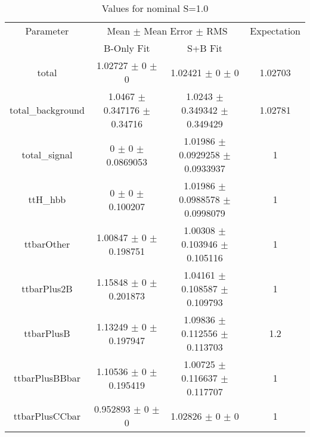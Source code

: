 \begin{table}
\centering
\caption{Values for nominal S=1.0}
\begin{tabular}{cccc}
\toprule
Parameter & \multicolumn{2}{c}{Mean $\pm$ Mean Error $\pm$ RMS} & Expectation\\
 & B-Only Fit & S+B Fit & \\
\midrule
total & \num{1.02727} $\pm$ \num{0} $\pm$ \num{0} & \num{1.02421} $\pm$ \num{0} $\pm$ \num{0} & \num{1.02703}\\
total\_background & \num{1.0467} $\pm$ \num{0.347176} $\pm$ \num{0.34716} & \num{1.0243} $\pm$ \num{0.349342} $\pm$ \num{0.349429} & \num{1.02781}\\
total\_signal & \num{0} $\pm$ \num{0} $\pm$ \num{0.0869053} & \num{1.01986} $\pm$ \num{0.0929258} $\pm$ \num{0.0933937} & \num{1}\\
ttH\_hbb & \num{0} $\pm$ \num{0} $\pm$ \num{0.100207} & \num{1.01986} $\pm$ \num{0.0988578} $\pm$ \num{0.0998079} & \num{1}\\
ttbarOther & \num{1.00847} $\pm$ \num{0} $\pm$ \num{0.198751} & \num{1.00308} $\pm$ \num{0.103946} $\pm$ \num{0.105116} & \num{1}\\
ttbarPlus2B & \num{1.15848} $\pm$ \num{0} $\pm$ \num{0.201873} & \num{1.04161} $\pm$ \num{0.108587} $\pm$ \num{0.109793} & \num{1}\\
ttbarPlusB & \num{1.13249} $\pm$ \num{0} $\pm$ \num{0.197947} & \num{1.09836} $\pm$ \num{0.112556} $\pm$ \num{0.113703} & \num{1.2}\\
ttbarPlusBBbar & \num{1.10536} $\pm$ \num{0} $\pm$ \num{0.195419} & \num{1.00725} $\pm$ \num{0.116637} $\pm$ \num{0.117707} & \num{1}\\
ttbarPlusCCbar & \num{0.952893} $\pm$ \num{0} $\pm$ \num{0} & \num{1.02826} $\pm$ \num{0} $\pm$ \num{0} & \num{1}\\
\bottomrule
\end{tabular}
\end{table}